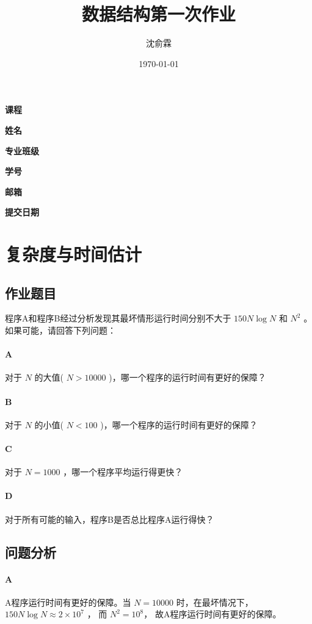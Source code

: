 \documentclass[UTF8]{ctexart}
\title{数据结构第一次作业}
\date{\today}
\author{沈俞霖}
\begin{document}
  \maketitle
  \vspace{100mm}
  \begin{flushright}
  \textbf{课程} 

  \textbf{姓名} 

  \textbf{专业班级} 

  \textbf{学号} 

  \textbf{邮箱} 

  \textbf{提交日期} \makebox[7em][l]{\today}
  \end{flushright}
  \newpage

  \tableofcontents
  \newpage

  \section{复杂度与时间估计}
    \subsection{作业题目}
      程序A和程序B经过分析发现其最坏情形运行时间分别不大于 $150N\log N$ 和 $N^2$ 。如果可能，请回答下列问题：
      \paragraph{A}
      对于 $N$ 的大值( $N>10000$ )，哪一个程序的运行时间有更好的保障？
      \paragraph{B}
      对于 $N$ 的小值( $N<100$ )，哪一个程序的运行时间有更好的保障？
      \paragraph{C}
      对于 $N=1000$ ，哪一个程序平均运行得更快？
      \paragraph{D}
      对于所有可能的输入，程序B是否总比程序A运行得快？
    \subsection{问题分析}
      \paragraph{A}
      A程序运行时间有更好的保障。当 $N=10000$ 时，在最坏情况下， $ 150 N \log N \approx 2 \times 10 ^ 7 $ ， 而 $ N^2 = 10 ^ 8 $， 故A程序运行时间有更好的保障。
\end{document}
